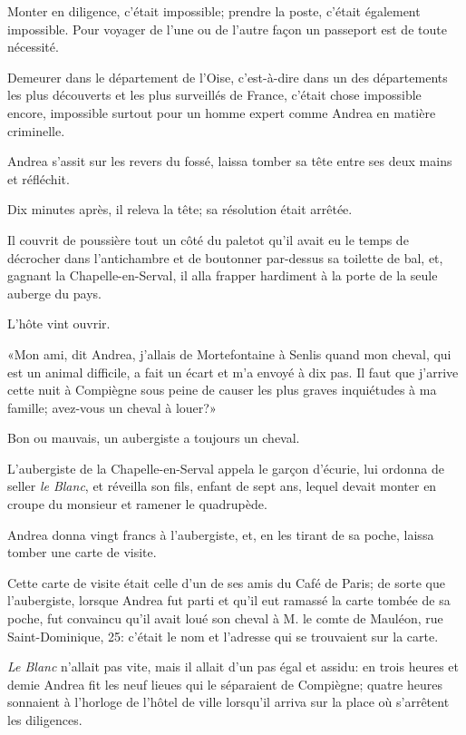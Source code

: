 Monter en diligence, c'était impossible; prendre la poste, c'était également impossible. Pour voyager de l'une ou de l'autre façon un passeport est de toute nécessité. 

Demeurer dans le département de l'Oise, c'est-à-dire dans un des départements les plus découverts et les plus surveillés de France, c'était chose impossible encore, impossible surtout pour un homme expert comme Andrea en matière criminelle. 

Andrea s'assit sur les revers du fossé, laissa tomber sa tête entre ses deux mains et réfléchit. 

Dix minutes après, il releva la tête; sa résolution était arrêtée. 

Il couvrit de poussière tout un côté du paletot qu'il avait eu le temps de décrocher dans l'antichambre et de boutonner par-dessus sa toilette de bal, et, gagnant la Chapelle-en-Serval, il alla frapper hardiment à la porte de la seule auberge du pays. 

L'hôte vint ouvrir. 

«Mon ami, dit Andrea, j'allais de Mortefontaine à Senlis quand mon cheval, qui est un animal difficile, a fait un écart et m'a envoyé à dix pas. Il faut que j'arrive cette nuit à Compiègne sous peine de causer les plus graves inquiétudes à ma famille; avez-vous un cheval à louer?» 

Bon ou mauvais, un aubergiste a toujours un cheval. 

L'aubergiste de la Chapelle-en-Serval appela le garçon d'écurie, lui ordonna de seller \textit{le Blanc}, et réveilla son fils, enfant de sept ans, lequel devait monter en croupe du monsieur et ramener le quadrupède. 

Andrea donna vingt francs à l'aubergiste, et, en les tirant de sa poche, laissa tomber une carte de visite. 

Cette carte de visite était celle d'un de ses amis du Café de Paris; de sorte que l'aubergiste, lorsque Andrea fut parti et qu'il eut ramassé la carte tombée de sa poche, fut convaincu qu'il avait loué son cheval à M. le comte de Mauléon, rue Saint-Dominique, 25: c'était le nom et l'adresse qui se trouvaient sur la carte. 

\textit{Le Blanc} n'allait pas vite, mais il allait d'un pas égal et assidu: en trois heures et demie Andrea fit les neuf lieues qui le séparaient de Compiègne; quatre heures sonnaient à l'horloge de l'hôtel de ville lorsqu'il arriva sur la place où s'arrêtent les diligences. 


